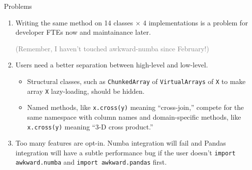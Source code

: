 \documentclass[aspectratio=169]{beamer}
\begin{document}
\begin{frame}{Problems}
\large
\vspace{0.5 cm}
\begin{enumerate}\setlength{\itemsep}{0.2 cm}
\item Writing the same method on 14 classes $\times$ 4 implementations is a problem for developer FTEs now and maintainance later.

\textcolor{gray}{(Remember, I haven't touched awkward-numba since February!)}

\item Users need a better separation between high-level and low-level.

\begin{itemize}\normalsize\setlength{\itemsep}{0.2 cm}
\item Structural classes, such as {\tt ChunkedArray} of {\tt VirtualArrays} of {\tt X} to make array {\tt X} lazy-loading, should be hidden.

\item Named methods, like \texttt{x.cross(y)} meaning ``cross-join,'' compete for the same namespace with column names and domain-specific methods, like \texttt{x.cross(y)} meaning ``3-D cross product.''
\end{itemize}

\item Too many features are opt-in. Numba integration will fail and Pandas integration will have a subtle performance bug if the user doesn't \texttt{import awkward.numba} and \texttt{import awkward.pandas} first.

\end{enumerate}
\end{frame}
\end{document}
